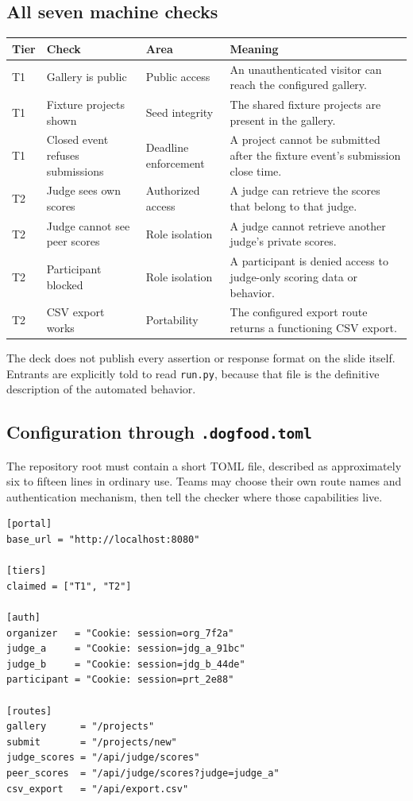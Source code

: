 \documentclass[11pt]{article}
\begin{document}
\subsection{All seven machine checks}

\begin{longtable}{@{}L{13mm}L{45mm}L{31mm}L{70mm}@{}}
\toprule
\textbf{Tier} & \textbf{Check} & \textbf{Area} & \textbf{Meaning}\\
\midrule
\endhead%
T1 & Gallery is public & Public access & An unauthenticated visitor can reach the configured gallery.\\
T1 & Fixture projects shown & Seed integrity & The shared fixture projects are present in the gallery.\\
T1 & Closed event refuses submissions & Deadline enforcement & A project cannot be submitted after the fixture event's submission close time.\\
T2 & Judge sees own scores & Authorized access & A judge can retrieve the scores that belong to that judge.\\
T2 & Judge cannot see peer scores & Role isolation & A judge cannot retrieve another judge's private scores.\\
T2 & Participant blocked & Role isolation & A participant is denied access to judge-only scoring data or behavior.\\
T2 & CSV export works & Portability & The configured export route returns a functioning CSV export.\\
\bottomrule
\end{longtable}

The deck does not publish every assertion or response format on the slide itself. Entrants are explicitly told to read \texttt{run.py}, because that file is the definitive description of the automated behavior.

\subsection{Configuration through \texttt{.dogfood.toml}}

The repository root must contain a short TOML file, described as approximately six to fifteen lines in ordinary use. Teams may choose their own route names and authentication mechanism, then tell the checker where those capabilities live.

\begin{lstlisting}[style=dogfood]
[portal]
base_url = "http://localhost:8080"

[tiers]
claimed = ["T1", "T2"]

[auth]
organizer   = "Cookie: session=org_7f2a"
judge_a     = "Cookie: session=jdg_a_91bc"
judge_b     = "Cookie: session=jdg_b_44de"
participant = "Cookie: session=prt_2e88"

[routes]
gallery      = "/projects"
submit       = "/projects/new"
judge_scores = "/api/judge/scores"
peer_scores  = "/api/judge/scores?judge=judge_a"
csv_export   = "/api/export.csv"
\end{lstlisting}
\end{document}
